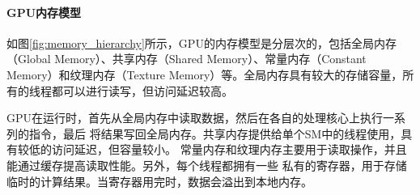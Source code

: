 \paragraph{GPU内存模型}

\par 如图\ref{fig:memory_hierarchy}\cite{nvidia_cuda}所示，GPU的内存模型是分层次的，包括全局内存（Global 
Memory）、共享内存（Shared Memory）、常量内存（Constant Memory）和纹理内存（Texture 
Memory）等。全局内存具有较大的存储容量，所有的线程都可以进行读写，但访问延迟较高。

\par GPU在运行时，首先从全局内存中读取数据，然后在各自的处理核心上执行一系列的指令，最后
将结果写回全局内存。共享内存提供给单个SM中的线程使用，具有较低的访问延迟，但容量较小。
常量内存和纹理内存主要用于读取操作，并且能通过缓存提高读取性能。另外，每个线程都拥有一些
私有的寄存器，用于存储临时的计算结果。当寄存器用完时，数据会溢出到本地内存。

